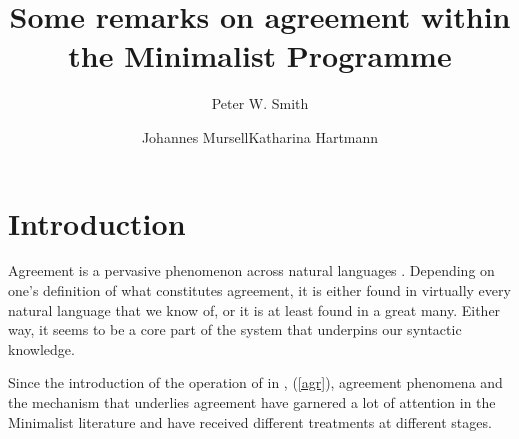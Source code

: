 \documentclass[output=paper
,modfonts
,nonflat]{langsci/langscibook}
\title{Some remarks on agreement within the Minimalist Programme}
\author{Peter W. Smith\affiliation{Goethe-University Frankfurt}\and Johannes Mursell\affiliation{Goethe-University Frankfurt}\lastand Katharina Hartmann\affiliation{Goethe-University Frankfurt}}
\begin{document}
\maketitle
\section{Introduction}
\label{secintro}

Agreement is a pervasive phenomenon across natural languages \citep{corbett2006}. Depending on one's definition of what constitutes agreement, it is either found in virtually every natural language that we know of, or it is at least found in a great many. Either way, it seems to be a core part of the system that underpins our syntactic knowledge.

Since the introduction of the operation of \agr{} in \citet{Chomsky2000}, (\ref{agr}), agreement phenomena and the mechanism that underlies agreement have garnered a lot of attention in the Minimalist literature and have received different treatments at different stages.
\end{document}
